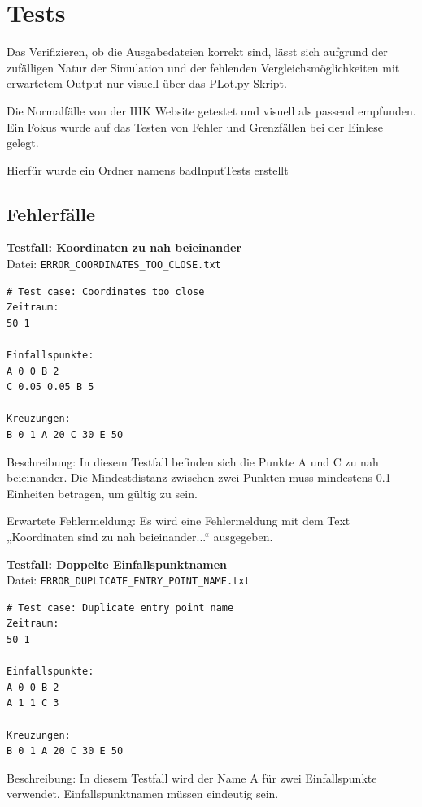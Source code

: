 \chapter{Tests}

Das Verifizieren, ob die Ausgabedateien korrekt sind,
lässt sich aufgrund der zufälligen Natur der Simulation und der fehlenden Vergleichsmöglichkeiten mit erwartetem Output
nur visuell über das PLot.py Skript.

Die Normalfälle von der IHK Website getestet und visuell als passend empfunden.
Ein Fokus wurde auf das Testen von Fehler und Grenzfällen bei der Einlese gelegt.

Hierfür wurde ein Ordner namens badInputTests erstellt

\section{Fehlerfälle}
\textbf{Testfall: Koordinaten zu nah beieinander} \\
Datei: \texttt{ERROR\_COORDINATES\_TOO\_CLOSE.txt}

\begin{lstlisting}
# Test case: Coordinates too close
Zeitraum:
50 1

Einfallspunkte:
A 0 0 B 2
C 0.05 0.05 B 5

Kreuzungen:
B 0 1 A 20 C 30 E 50
\end{lstlisting}

Beschreibung: In diesem Testfall befinden sich die Punkte A und C zu nah beieinander.
Die Mindestdistanz zwischen zwei Punkten muss mindestens 0.1 Einheiten betragen, um gültig zu sein.

Erwartete Fehlermeldung: Es wird eine Fehlermeldung mit dem Text „Koordinaten sind zu nah beieinander...“ ausgegeben.
\clearpage

\textbf{Testfall: Doppelte Einfallspunktnamen} \\
Datei: \texttt{ERROR\_DUPLICATE\_ENTRY\_POINT\_NAME.txt}

\begin{lstlisting}
# Test case: Duplicate entry point name
Zeitraum:
50 1

Einfallspunkte:
A 0 0 B 2
A 1 1 C 3

Kreuzungen:
B 0 1 A 20 C 30 E 50
\end{lstlisting}

Beschreibung: In diesem Testfall wird der Name A für zwei Einfallspunkte verwendet.
Einfallspunktnamen müssen eindeutig sein.

